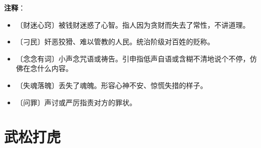 \documentclass[12pt,UTF-8,openany]{ctexbook}
\begin{document}
\newpage

\textbf{注释}：

\vspace{-1em}

\begin{itemize}
    \setlength\itemsep{-0.2em}
    \item 〔财迷心窍〕被钱财迷惑了心智。指人因为贪财而失去了常性，不讲道理。
    \item 〔刁民〕奸恶狡猾、难以管教的人民。统治阶级对百姓的贬称。
    \item 〔念念有词〕小声念咒语或祷告。引申指低声自语或含糊不清地说个不停，仿佛在念什么内容。
    \item 〔失魂落魄〕丢失了魂魄。形容心神不安、惊慌失措的样子。
    \item 〔问罪〕声讨或严厉指责对方的罪状。
\end{itemize}

\chapter{武松打虎}
\end{document}
